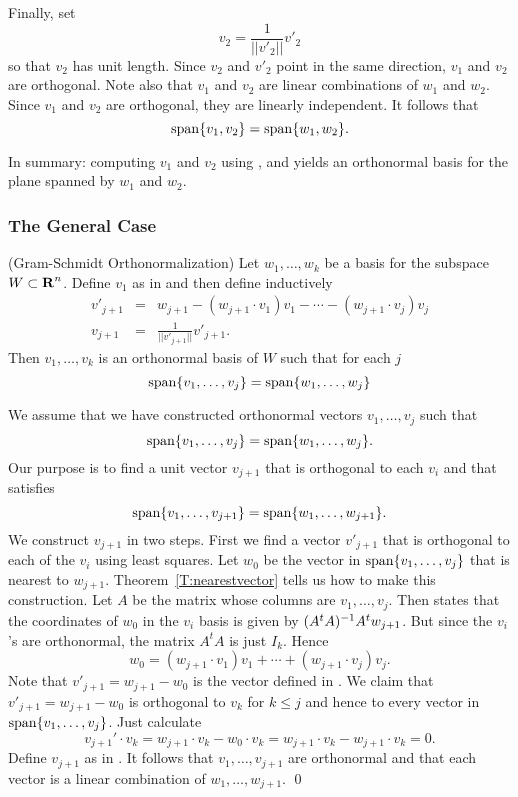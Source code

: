Finally, set
\begin{equation}  \label{E:ortho3}
v_2 = \frac{1}{||v'_2||}v'_2
\end{equation}
so that $v_2$ has unit length.  Since $v_2$ and $v'_2$ point in the
same direction, $v_1$ and $v_2$ are orthogonal.  Note also that $v_1$ and
$v_2$ are linear combinations of $w_1$ and $w_2$.  Since $v_1$ and $v_2$ are
orthogonal, they are linearly independent.  It follows that
\[
{\rm span}\{v_1,v_2\} = {\rm span}\{w_1,w_2\}.
\]

In summary: computing $v_1$ and $v_2$ using , 
and  yields an orthonormal basis for the
plane spanned by $w_1$ and $w_2$.

\subsubsection*{The General Case}

\begin{thm} (Gram-Schmidt Orthonormalization) \label{T:orthobasis}
Let $w_1,\ldots,w_k$ be a basis for the subspace $W\subset\mbox{$\bf{R}$}^n$.  Define
$v_1$ as in  and then define inductively
\begin{eqnarray}
v'_{j+1} & = & w_{j+1} -(w_{j+1}\cdot v_1)v_1- \cdots -(w_{j+1}\cdot v_j)v_j
\label{E:inductiveGS} \\
v_{j+1} & = & \frac{1}{||v'_{j+1}||}v'_{j+1}. \label{eq:gsnormal}
\end{eqnarray}
Then $v_1,\ldots,v_k$ is an orthonormal basis of $W$ such that for each $j$
\[
{\rm span}\{v_1,\ldots,v_j\} = {\rm span}\{w_1,\ldots,w_j\}
\]
\end{thm}

\proof  We assume that we have constructed orthonormal vectors $v_1,\ldots,v_j$
such that
\[
{\rm span}\{v_1,\ldots,v_j\} = {\rm span}\{w_1,\ldots,w_j\}.
\]
Our purpose is to find a unit vector $v_{j+1}$ that is orthogonal to each $v_i$
and that satisfies
\[
{\rm span}\{v_1,\ldots,v_{j+1}\} = {\rm span}\{w_1,\ldots,w_{j+1}\}.
\]
We construct $v_{j+1}$ in two steps.  First we find a vector $v'_{j+1}$
that is orthogonal to each of the $v_i$ using least squares.  Let $w_0$
be the vector in ${\rm span}\{v_1,\ldots,v_j\}$ that is nearest to $w_{j+1}$.
Theorem~\ref{T:nearestvector} tells us how to make this construction.
Let $A$ be the matrix whose columns are $v_1,\ldots,v_j$.  Then
 states that the coordinates of $w_0$ in the $v_i$ basis
is given by $(A^tA)^{-1} A^tw_{j+1}$. But since the $v_i$'s are orthonormal,
the matrix $A^tA$ is just $I_k$.  Hence
\[
w_0 =  (w_{j+1}\cdot v_1)v_1 + \cdots + (w_{j+1}\cdot v_j)v_j.
\]
Note that $v'_{j+1}=w_{j+1}-w_0$ is the vector defined in .
We claim that $v'_{j+1}=w_{j+1}-w_0$ is orthogonal to $v_k$ for $k\leq j$
and hence to every vector in ${\rm span}\{v_1,\ldots,v_j\}$.  Just calculate
\[
v_{j+1}'\cdot v_k = w_{j+1}\cdot v_k - w_0\cdot v_k =
w_{j+1}\cdot v_k -  w_{j+1}\cdot v_k = 0.
\]
Define $v_{j+1}$ as in
.  It follows that $v_1,\ldots,v_{j+1}$ are orthonormal and
that each vector is a linear combination of $w_1,\ldots,w_{j+1}$.  \qed


